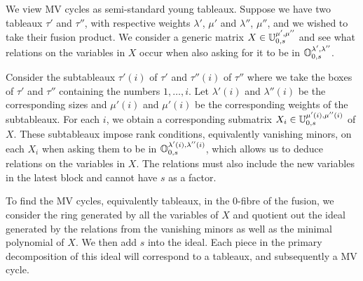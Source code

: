 \documentclass{article} %
\begin{document}

We view MV cycles as semi-standard young tableaux. Suppose we have two tableaux $\tau'$ and $\tau''$, with respective weights $\lambda'$, $\mu'$ and $\lambda''$, $\mu''$, and we wished to take their fusion product. We consider a generic matrix $X \in \mathbb U^{\mu',\mu''}_{0,s}$ and see what relations on the variables in $X$ occur when also asking for it to be in $\mathbb O^{\lambda',\lambda''}_{0,s}$. 

Consider the subtableaux $\tau'(i)$ of $\tau'$ and $\tau''(i)$ of $\tau''$ where we take the boxes of $\tau'$ and $\tau''$ containing the numbers $1,\dots,i$. Let $\lambda'(i)$ and $\lambda''(i)$ be the corresponding sizes and $\mu'(i)$ and $\mu'(i)$ be the corresponding weights of the subtableaux. For each $i$, we obtain a corresponding submatrix $X_i \in \mathbb U^{\mu'(i), \mu''(i)}_{0,s}$ of $X$. These subtableaux impose rank conditions, equivalently vanishing minors, on each $X_i$ when asking them to be in $\mathbb O^{\lambda'(i), \lambda''(i)}_{0,s}$, which allows us to deduce relations on the variables in $X$. The relations must also include the new variables in the latest block and cannot have $s$ as a factor.

To find the MV cycles, equivalently tableaux, in the $0$-fibre of the fusion, we consider the ring generated by all the variables of $X$ and quotient out the ideal generated by the relations from the vanishing minors as well as the minimal polynomial of $X$. We then add $s$ into the ideal. Each piece in the primary decomposition of this ideal will correspond to a tableaux, and subsequently a MV cycle.



\end{document}
